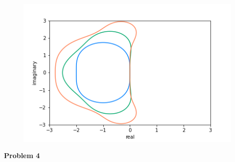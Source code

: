 \documentclass[10pt]{article}
\begin{document}
\begin{enumerate}[label=(\alph*)]
    \begin{figure}[H]
        \includegraphics[scale=0.5]{RK_boundaries.png}
    \end{figure}
\end{enumerate}
\textbf{Problem 4}
\end{document}
